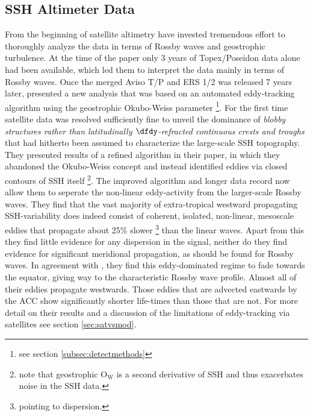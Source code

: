\subsection[\Citeauthor{Chelton2007}~\citeyear{Chelton2007,Chelton2011}]{SSH Altimeter Data \cite{Chelton2007,Chelton2011}}\label{sec:hist_chelton}
From the beginning of satellite altimetry \citeauthor{Chelton2011} have invested tremendous effort to thoroughly analyze the data in terms of
Rossby waves and geostrophic turbulence. At the time of the \citet{Killworth1997a} paper only 3 years of Topex/Poseidon data alone had been available,
which led them to interpret the data mainly in terms of Rossby waves. Once the merged Aviso T/P and ERS 1/2 \citet{Forget2010} was released 7 years later,
\citeauthor{Chelton2007} presented a new analysis that was based on an automated eddy-tracking algorithm using the geostrophic Okubo-Weiss parameter
\footnote{see section \ref{subsec:detectmethods}}. For the first time satellite data was resolved sufficiently fine to unveil the dominance of \textit{blobby
 structures rather than latitudinally $\dfdy$-refracted continuous crests and troughs} that had hitherto been assumed to characterize the large-scale SSH
topography. They presented results of a refined algorithm in their \citeyear{Chelton2011} paper, in
which they abandoned the Okubo-Weiss concept and instead identified eddies via closed contours of SSH itself \footnote{note that geostrophic $\mathrm{O_W}$ is a
second derivative of SSH and thus exacerbates noise in the SSH data.}.
The improved algorithm and longer data record now allow them to seperate the non-linear eddy-activity from the larger-scale Rossby waves. They find that the vast majority of extra-tropical westward propagating SSH-variability does indeed consist of coherent, isolated, non-linear, mesoscale eddies that propagate about 25\% slower \footnote{pointing to dispersion.} than the linear waves.
Apart from this they find little evidence for any dispersion in the signal,
neither do they find evidence for significant meridional propagation, as should be found for Rossby waves. In agreement with \citet{rhines1979theoretical}, they
find this eddy-dominated regime to fade towards the equator,
giving way to the characteristic Rossby wave profile. Almost all of their eddies propagate westwards. Those eddies that are advected eastwards by \eg the ACC show significantly shorter life-times than those that are not. For more detail on their results and a discussion of the limitations of eddy-tracking via satellites see section \cref{sec:satvsmod}.

\newpage
{}
